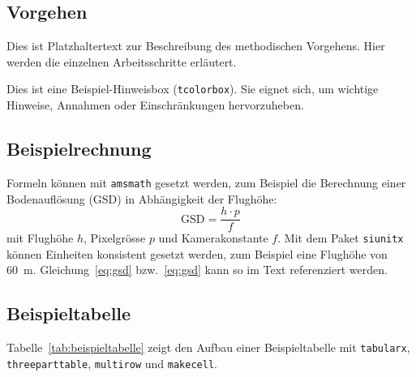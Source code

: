 \subsection{Vorgehen}
\label{subsec:vorgehen}
Dies ist Platzhaltertext zur Beschreibung des methodischen Vorgehens. Hier werden die
einzelnen Arbeitsschritte erläutert.

\begin{tcolorbox}[myboxstyle, title=Hinweis]
Dies ist eine Beispiel-Hinweisbox (\texttt{tcolorbox}). Sie eignet sich, um wichtige
Hinweise, Annahmen oder Einschränkungen hervorzuheben.
\end{tcolorbox}

\subsection{Beispielrechnung}
\label{subsec:beispielrechnung}
Formeln können mit \texttt{amsmath} gesetzt werden, zum Beispiel die Berechnung einer
Bodenauflösung (GSD) in Abhängigkeit der Flughöhe:
\begin{equation}
    \text{GSD} = \frac{h \cdot p}{f}
    \label{eq:gsd}
\end{equation}
mit Flughöhe $h$, Pixelgrösse $p$ und Kamerakonstante $f$. Mit dem Paket \texttt{siunitx}
können Einheiten konsistent gesetzt werden, zum Beispiel eine Flughöhe von \SI{60}{\meter}.
Gleichung~\ref{eq:gsd} bzw.\ \cref{eq:gsd} kann so im Text referenziert werden.

\subsection{Beispieltabelle}
\label{subsec:beispieltabelle}
Tabelle~\ref{tab:beispieltabelle} zeigt den Aufbau einer Beispieltabelle mit
\texttt{tabularx}, \texttt{threeparttable}, \texttt{multirow} und \texttt{makecell}.

